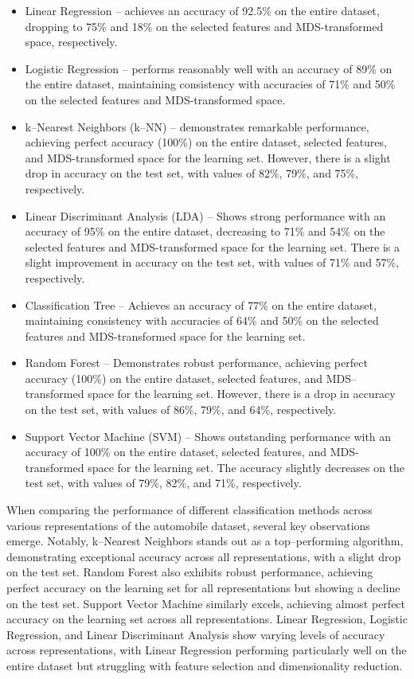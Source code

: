 \documentclass[11pt,a4paper]{article}\usepackage[]{graphicx}\usepackage[]{xcolor}
\begin{document}
\begin{itemize}
\item Linear Regression -- achieves an accuracy of 92.5\% on the entire dataset, dropping to 75\% and 18\% on the selected features and MDS-transformed space, respectively.
\item Logistic Regression -- performs reasonably well with an accuracy of 89\% on the entire dataset, maintaining consistency with accuracies of 71\% and 50\% on the selected features and MDS-transformed space.
\item k--Nearest Neighbors (k--NN) -- demonstrates remarkable performance, achieving perfect accuracy (100\%) on the entire dataset, selected features, and MDS-transformed space for the learning set. However, there is a slight drop in accuracy on the test set, with values of 82\%, 79\%, and 75\%, respectively.
\item Linear Discriminant Analysis (LDA) -- Shows strong performance with an accuracy of 95\% on the entire dataset, decreasing to 71\% and 54\% on the selected features and MDS-transformed space for the learning set. There is a slight improvement in accuracy on the test set, with values of 71\% and 57\%, respectively.
\item Classification Tree -- Achieves an accuracy of 77\% on the entire dataset, maintaining consistency with accuracies of 64\% and 50\% on the selected features and MDS-transformed space for the learning set.
\item Random Forest -- Demonstrates robust performance, achieving perfect accuracy (100\%) on the entire dataset, selected features, and MDS--transformed space for the learning set. However, there is a drop in accuracy on the test set, with values of 86\%, 79\%, and 64\%, respectively.
\item Support Vector Machine (SVM) -- Shows outstanding performance with an accuracy of 100\% on the entire dataset, selected features, and MDS-transformed space for the learning set. The accuracy slightly decreases on the test set, with values of 79\%, 82\%, and 71\%, respectively.
\end{itemize}
When comparing the performance of different classification methods across various representations of the automobile dataset, several key observations emerge. Notably, k--Nearest Neighbors stands out as a top--performing algorithm, demonstrating exceptional accuracy across all representations, with a slight drop on the test set. Random Forest also exhibits robust performance, achieving perfect accuracy on the learning set for all representations but showing a decline on the test set. Support Vector Machine similarly excels, achieving almost perfect accuracy on the learning set across all representations. Linear Regression, Logistic Regression, and Linear Discriminant Analysis show varying levels of accuracy across representations, with Linear Regression performing particularly well on the entire dataset but struggling with feature selection and dimensionality reduction. 
\end{document}
